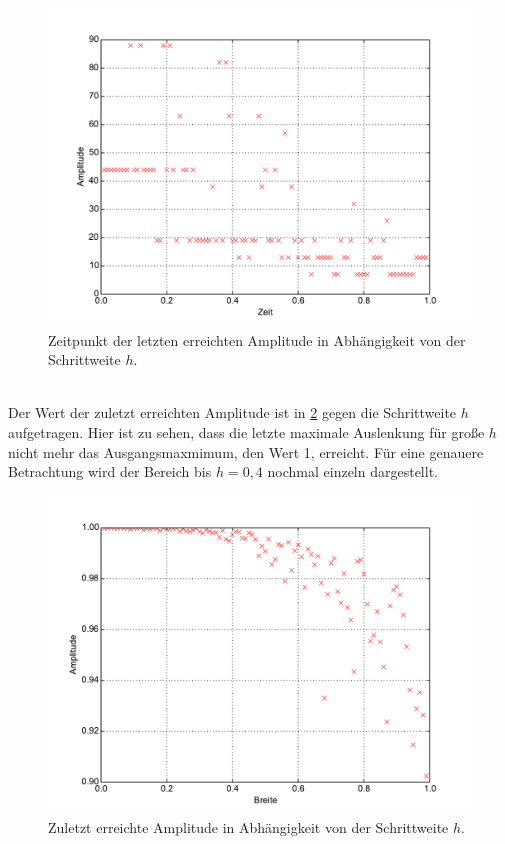 \begin{figure}[h]
	\centering
	\includegraphics[width = \textwidth]{../Plots/Plot_2_B_Stabilitaet_Zeit.pdf}
	\caption{Zeitpunkt der letzten erreichten Amplitude in Abhängigkeit von der Schrittweite $h$.\label{fig:AmplitudeSchritt}}
\end{figure}\\
Der Wert der zuletzt erreichten Amplitude ist in \cref{fig:Stabilitaet} gegen die Schrittweite $h$ aufgetragen.
Hier ist zu sehen, dass die letzte maximale Auslenkung für große $h$ nicht mehr das Ausgangsmaxmimum, den Wert 1, erreicht.
Für eine genauere Betrachtung wird der Bereich bis $h=0,4$ nochmal einzeln dargestellt.
\begin{figure}[h]
	\centering
	\includegraphics[width = \textwidth]{../Plots/Plot_2_B_Stabilitaet.pdf}
	\caption{Zuletzt erreichte Amplitude in Abhängigkeit von der Schrittweite $h$.\label{fig:Stabilitaet}}
\end{figure}
